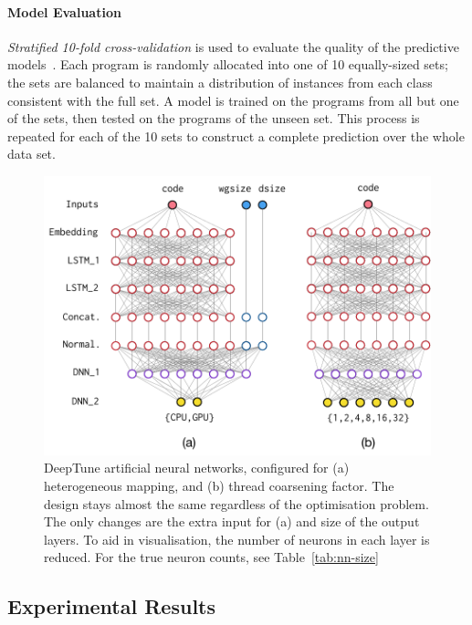 \paragraph*{Model Evaluation}

\emph{Stratified 10-fold cross-validation} is used to evaluate the quality of the predictive models~\cite{Han2011}. Each program is randomly allocated into one of 10 equally-sized sets; the sets are balanced to maintain a distribution of instances from each class consistent with the full set. A model is trained on the programs from all but one of the sets, then tested on the programs of the unseen set. This process is repeated for each of the 10 sets to construct a complete prediction over the whole data set.

\begin{figure}[t!]
  \centering
  \includegraphics[width=\columnwidth]{img/nn} %
  \caption[DeepTune artificial neural networks]{%
    DeepTune artificial neural networks, configured for (a) heterogeneous mapping, and (b) thread coarsening factor. The design stays almost the same regardless of the optimisation problem. The only changes are the extra input for (a) and size of the output layers. To aid in visualisation, the number of neurons in each layer is reduced. For the true neuron counts, see Table~\ref{tab:nn-size}%
  }%
  \label{fig:nn}
\end{figure}


\subsection{Experimental Results}

